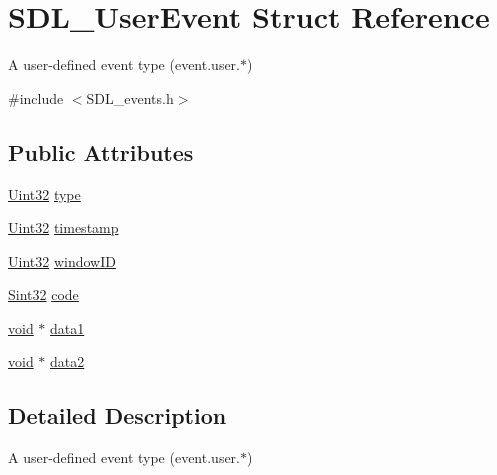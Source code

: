 \hypertarget{struct_s_d_l___user_event}{\section{S\-D\-L\-\_\-\-User\-Event Struct Reference}
\label{struct_s_d_l___user_event}
}


A user-\/defined event type (event.\-user.$\ast$)  




{\ttfamily \#include $<$S\-D\-L\-\_\-events.\-h$>$}

\subsection*{Public Attributes}
\begin{DoxyCompactItemize}
\item 
\hyperlink{_s_d_l__stdinc_8h_add440eff171ea5f55cb00c4a9ab8672d}{Uint32} \hyperlink{struct_s_d_l___user_event_ab7afa8b98dbd7b52bef41155e10f7340}{type}
\item 
\hyperlink{_s_d_l__stdinc_8h_add440eff171ea5f55cb00c4a9ab8672d}{Uint32} \hyperlink{struct_s_d_l___user_event_adbf1d34c73138a0c549310e5d4ad0c35}{timestamp}
\item 
\hyperlink{_s_d_l__stdinc_8h_add440eff171ea5f55cb00c4a9ab8672d}{Uint32} \hyperlink{struct_s_d_l___user_event_abccefa10e0e0e3a0801bc6d836a08da7}{window\-I\-D}
\item 
\hyperlink{_s_d_l__stdinc_8h_a7a90b941db9d4582e9ad7abb9940ff7e}{Sint32} \hyperlink{struct_s_d_l___user_event_aef47976781ee82b527a353c5acfa0a34}{code}
\item 
\hyperlink{_s_d_l__opengl_8h_a3db05964a3cc4410f35b7ea2b7eb850d}{void} $\ast$ \hyperlink{struct_s_d_l___user_event_ab2893a12be2f97195f16463a23107913}{data1}
\item 
\hyperlink{_s_d_l__opengl_8h_a3db05964a3cc4410f35b7ea2b7eb850d}{void} $\ast$ \hyperlink{struct_s_d_l___user_event_aae4dbf65c34d654c9edf519eb061b7cf}{data2}
\end{DoxyCompactItemize}


\subsection{Detailed Description}
A user-\/defined event type (event.\-user.$\ast$) 

